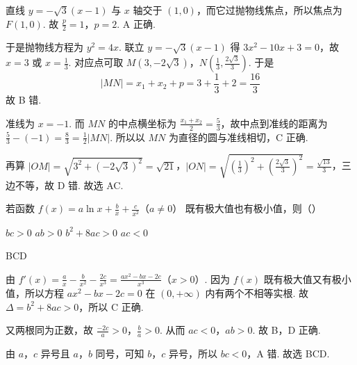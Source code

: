 \begin{solution}
直线 \(y=-\sqrt3(x-1)\) 与 \(x\) 轴交于 \((1,0)\)，而它过抛物线焦点，所以焦点为 \(F(1,0)\). 故 \(\frac p2=1\)，\(p=2\). A 正确.

于是抛物线方程为 \(y^2=4x\). 联立 \(y=-\sqrt3(x-1)\) 得 \(3x^2-10x+3=0\)，故 \(x=3\) 或 \(x=\frac13\). 对应点可取 \(M(3,-2\sqrt3)\)，\(N\left(\frac13,\frac{2\sqrt3}{3}\right)\). 于是
\[
|MN|=x_1+x_2+p=3+\frac13+2=\frac{16}{3}
\]
故 B 错.

准线为 \(x=-1\). 而 \(MN\) 的中点横坐标为 \(\frac{x_1+x_2}{2}=\frac53\)，故中点到准线的距离为 \(\frac53-(-1)=\frac83=\frac12|MN|\). 所以以 \(MN\) 为直径的圆与准线相切，C 正确.

再算 \(|OM|=\sqrt{3^2+(-2\sqrt3)^2}=\sqrt{21}\)，\(|ON|=\sqrt{\left(\frac13\right)^2+\left(\frac{2\sqrt3}{3}\right)^2}=\frac{\sqrt{13}}{3}\)，三边不等，故 D 错. 故选 AC.

\end{solution}

\begin{problem}
若函数 \(f(x)=a\ln x+\frac{b}{x}+\frac{c}{x^2}\)（\(a\ne 0\)） 既有极大值也有极小值，则（\quad）

\choices
    {\(bc>0\)}
    {\(ab>0\)}
    {\(b^2+8ac>0\)}
    {\(ac<0\)}
\end{problem}

\begin{answer}
BCD
\end{answer}

\begin{solution}
由 \(f'(x)=\frac{a}{x}-\frac{b}{x^2}-\frac{2c}{x^3}=\frac{ax^2-bx-2c}{x^3}\)（\(x>0\)）. 因为 \(f(x)\) 既有极大值又有极小值，所以方程 \(ax^2-bx-2c=0\) 在 \((0,+\infty)\) 内有两个不相等实根. 故 \(\Delta=b^2+8ac>0\)，所以 C 正确.

又两根同为正数，故 \(\frac{-2c}{a}>0\)，\(\frac{b}{a}>0\). 从而 \(ac<0\)，\(ab>0\). 故 B，D 正确.

由 \(a\)，\(c\) 异号且 \(a\)，\(b\) 同号，可知 \(b\)，\(c\) 异号，所以 \(bc<0\)，A 错. 故选 BCD.

\end{solution}

